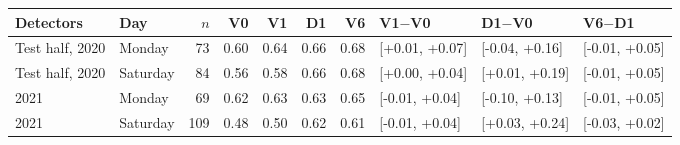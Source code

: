 \begin{tabular}{@{}llrrrrrlll@{}}\toprule
Detectors & Day & $n$ & V0 & V1 & D1 & V6 & V1$-$V0 & D1$-$V0 & V6$-$D1 \\\midrule
Test half, 2020 & Monday & 73 & 0.60 & 0.64 & 0.66 & 0.68 & [+0.01, +0.07] & [-0.04, +0.16] & [-0.01, +0.05] \\
Test half, 2020 & Saturday & 84 & 0.56 & 0.58 & 0.66 & 0.68 & [+0.00, +0.04] & [+0.01, +0.19] & [-0.01, +0.05] \\
2021 & Monday & 69 & 0.62 & 0.63 & 0.63 & 0.65 & [-0.01, +0.04] & [-0.10, +0.13] & [-0.01, +0.05] \\
2021 & Saturday & 109 & 0.48 & 0.50 & 0.62 & 0.61 & [-0.01, +0.04] & [+0.03, +0.24] & [-0.03, +0.02] \\
\bottomrule\end{tabular}
